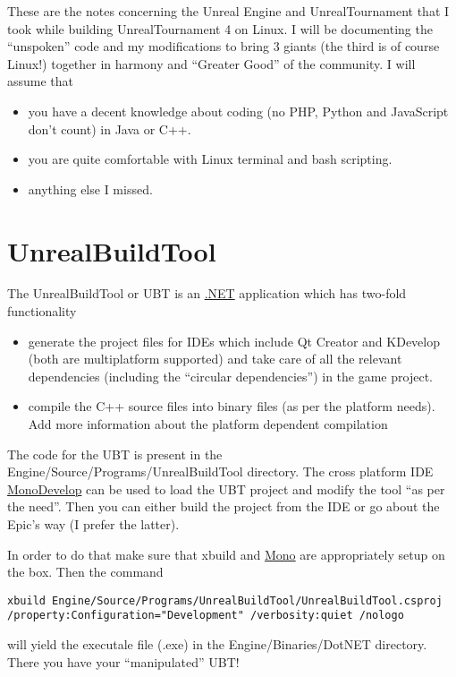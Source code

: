 \documentclass{article}
\begin{document}
These are the notes concerning the Unreal Engine and UnrealTournament that I took while building UnrealTournament 4 on Linux.  I will be documenting the ``unspoken'' code and my modifications to bring 3 giants (the third is of course Linux!) together in harmony and ``Greater Good'' of the community.  I will assume that
\begin{itemize}
\item you have a decent knowledge about coding (no PHP, Python and JavaScript don't count) in Java or C++.
\item you are quite comfortable with Linux terminal and bash scripting.  
\item anything else I missed.
\end{itemize}


\section{UnrealBuildTool}
\label{sec:ubt}
The UnrealBuildTool or UBT is an \href{https://dotnet.microsoft.com/}{{\color{Blue}.NET}} application which has two-fold functionality
\begin{itemize}
\item generate the project files for IDEs which include Qt Creator and KDevelop (both are multiplatform supported) and take care of all the relevant dependencies (including the ``circular dependencies'') in the game project.
\item compile the C++ source files into binary files (as per the platform needs). {\color{Red}Add more information about the platform dependent compilation}
\end{itemize}

The code for the UBT is present in the {\ttfamily Engine/Source/Programs/UnrealBuildTool } directory.  The cross platform IDE \href{https://www.monodevelop.com/}{\color{Blue}MonoDevelop} can be used to load the UBT project and modify the tool ``as per the need''.  Then you can either build the project from the IDE or go about the Epic's way (I prefer the latter).

In order to do that make sure that xbuild and \href{https://www.mono-project.com/}{{\color{Blue}Mono}} are appropriately setup on the box.  Then the command
\lstset{language=bash} 
\begin{lstlisting}[frame=single]
  xbuild Engine/Source/Programs/UnrealBuildTool/UnrealBuildTool.csproj /property:Configuration="Development" /verbosity:quiet /nologo
\end{lstlisting}
will yield the executale file (.exe) in the {\ttfamily Engine/Binaries/DotNET} directory.  There you have your ``manipulated'' UBT!
\end{document}
